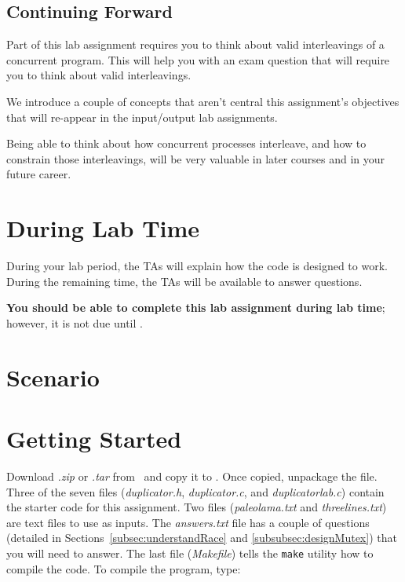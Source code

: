     \subsection*{Continuing Forward}

    Part of this lab assignment requires you to think about valid interleavings of a concurrent program.
    This will help you with an exam question that will require you to think about valid interleavings.

    We introduce a couple of concepts that aren't central this assignment's objectives that will re-appear in the input/output lab assignments.

    Being able to think about how concurrent processes interleave, and how to constrain those interleavings, will be very valuable in later courses and in your future career.

    \section*{During Lab Time}

    During your lab period, the TAs will explain how the code is designed to work.
    During the remaining time, the TAs will be available to answer questions.

    \textbf{You should be able to complete this lab assignment during lab time};
    however, it is not due until \duedate.



    \section{Scenario}

    \PickingUpNewmansProject


    \section{Getting Started}

    Download \textit{\shortlabname.zip} or \textit{\shortlabname.tar} from \filesource\ and copy it to \runtimeenvironment.
    Once copied, unpackage the file.
    Three of the seven files (\textit{duplicator.h}, \textit{duplicator.c}, and \textit{duplicatorlab.c}) contain the starter code for this assignment.
    Two files (\textit{paleolama.txt} and \textit{threelines.txt}) are text files to use as inputs.
    The \textit{answers.txt} file has a couple of questions (detailed in Sections~\ref{subsec:understandRace} and \ref{subsubsec:designMutex}) that you will need to answer.
    The last file (\textit{Makefile}) tells the \texttt{make} utility how to compile the code.
    To compile the program, type:

